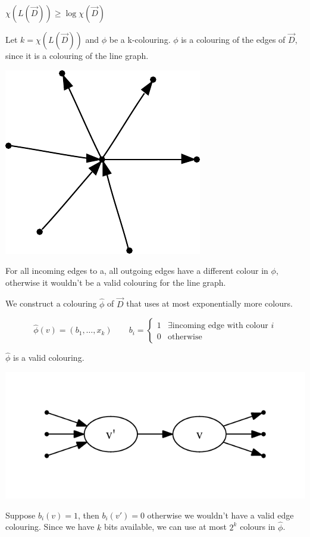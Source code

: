 \begin{lem} $\chi(L(\vec D)) \geq \log \chi(\vec D)$ \end{lem}

\begin{pr} Let $k=\chi(L(\vec D))$ and $\phi$ be a k-colouring. $\phi$ is a colouring of the edges of $\vec D$, since it is a colouring of the line graph.

\begin{center}
\includegraphics{./images/edge_coloring_line_graph}
\end{center}

For all incoming edges to a, all outgoing edges have a different colour in $\phi$, otherwise it wouldn't be a valid colouring for the line graph.

We construct a colouring $\hat \phi$ of $\vec D$ that uses at most exponentially more colours. 

\[\hat \phi(v) = (b_1,\ldots,x_k)\qquad b_i= \begin{cases} 1 & \exists \text{incoming edge with colour } i\\0 & \text{otherwise}\end{cases}\]

$\hat \phi$ is a valid colouring.

\begin{center}
\includegraphics{./images/coloring_from_edges}
\end{center}

Suppose $b_i(v)=1$, then $b_i(v')=0$ otherwise we wouldn't have a valid edge colouring. Since we have $k$ bits available, we can use at most $2^k$ colours in $\hat \phi$.

\end{pr}

